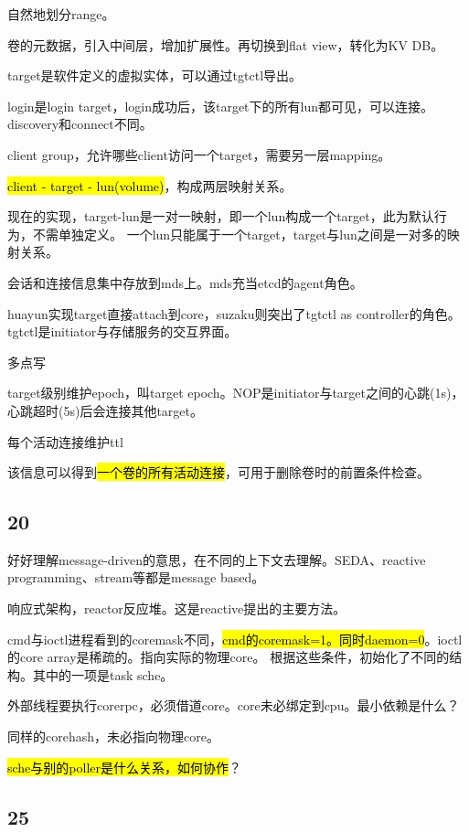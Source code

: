 自然地划分range。

卷的元数据，引入中间层，增加扩展性。再切换到flat view，转化为KV DB。

\hrulefill

target是软件定义的虚拟实体，可以通过tgtctl导出。

login是login target，login成功后，该target下的所有lun都可见，可以连接。discovery和connect不同。

client group，允许哪些client访问一个target，需要另一层mapping。

\hl{client - target - lun(volume)}，构成两层映射关系。

现在的实现，target-lun是一对一映射，即一个lun构成一个target，此为默认行为，不需单独定义。
一个lun只能属于一个target，target与lun之间是一对多的映射关系。

会话和连接信息集中存放到mds上。mds充当etcd的agent角色。

huayun实现target直接attach到core，suzaku则突出了tgtctl as controller的角色。
tgtctl是initiator与存储服务的交互界面。

\hrulefill

多点写

target级别维护epoch，叫target epoch。NOP是initiator与target之间的心跳(1s)，心跳超时(5s)后会连接其他target。

每个活动连接维护ttl

该信息可以得到\hl{一个卷的所有活动连接}，可用于删除卷时的前置条件检查。

\subsection{20}

好好理解message-driven的意思，在不同的上下文去理解。SEDA、reactive programming、stream等都是message based。

响应式架构，reactor反应堆。这是reactive提出的主要方法。

\hrulefill

cmd与ioctl进程看到的coremask不同，\hl{cmd的coremask=1。同时daemon=0}。ioctl的core array是稀疏的。指向实际的物理core。
根据这些条件，初始化了不同的结构。其中的一项是task sche。

外部线程要执行corerpc，必须借道core。core未必绑定到cpu。最小依赖是什么？

同样的corehash，未必指向物理core。

\hl{sche与别的poller是什么关系，如何协作}？

\subsection{25}

